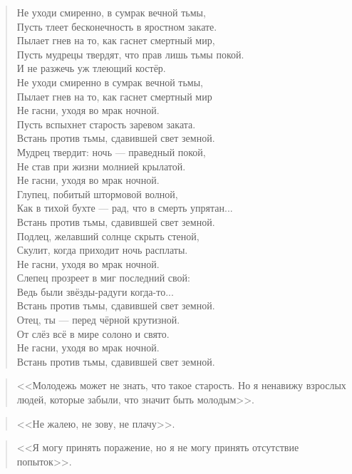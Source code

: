 \documentclass[a4paper,11pt]{article} %
\begin{document}
	\begin{quote}
		\begin{center}
			Не уходи смиренно, в сумрак вечной тьмы, \\
			Пусть тлеет бесконечность в яростном закате. \\
			Пылает гнев на то, как гаснет смертный мир, \\
			Пусть мудрецы твердят, что прав лишь тьмы покой. \\
			И не разжечь уж тлеющий костёр. \\
			Не уходи смиренно в сумрак вечной тьмы, \\
			Пылает гнев на то, как гаснет смертный мир \\
			Не гасни, уходя во мрак ночной. \\
			Пусть вспыхнет старость заревом заката. \\
			Встань против тьмы, сдавившей свет земной. \\
			Мудрец твердит: ночь — праведный покой, \\
			Не став при жизни молнией крылатой. \\
			Не гасни, уходя во мрак ночной. \\
			Глупец, побитый штормовой волной, \\
			Как в тихой бухте — рад, что в смерть упрятан... \\
			Встань против тьмы, сдавившей свет земной. \\
			Подлец, желавший солнце скрыть стеной, \\
			Скулит, когда приходит ночь расплаты. \\
			Не гасни, уходя во мрак ночной. \\
			Слепец прозреет в миг последний свой: \\
			Ведь были звёзды-радуги когда-то... \\
			Встань против тьмы, сдавившей свет земной. \\
			Отец, ты — перед чёрной крутизной. \\
			От слёз всё в мире солоно и свято. \\
			Не гасни, уходя во мрак ночной. \\
			Встань против тьмы, сдавившей свет земной.
		\end{center}
	\end{quote}
	\begin{quote}
		<<Молодежь может не знать, что такое старость. Но я ненавижу взрослых людей, которые забыли, что значит быть молодым>>.
	\end{quote}
	\begin{quote}
		<<Не жалею, не зову, не плачу>>.
	\end{quote}
	\begin{quote}
		<<Я могу принять поражение, но я не могу принять отсутствие попыток>>.
	\end{quote}
	
\end{document}
